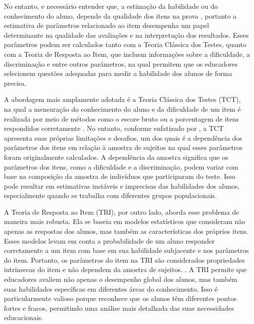 No entanto, e necessário entender que, a estimação da habilidade ou do conhecimento do aluno, depende da qualidade dos itens na prova \cite{BORGATTO2012}, portanto a estimativa de parâmetros relacionado ao item desempenha um papel determinante na qualidade das avaliações e na interpretação dos resultados. Esses parâmetros podem ser calculados tanto com a Teoria Clássica dos Testes, quanto com a Teoria de Resposta ao Item, que incluem informações sobre a dificuldade, a discriminação e entre outros parâmetros, na qual permitem que os educadores selecionem questões adequadas para medir a habilidade dos alunos de forma precisa. 

A abordagem mais amplamente adotada é a Teoria Clássica dos Testes (TCT), na qual a mensuração do conhecimento do aluno e da dificuldade de um item é realizada por meio de métodos como o escore bruto ou a porcentagem de itens respondidos corretamente \cite{pasquali2003}. No entanto, conforme enfatizado por , a TCT apresenta suas próprias limitações e desafios, um dos quais é a dependência dos parâmetros dos itens em relação à amostra de sujeitos na qual esses parâmetros foram originalmente calculados. A dependência da amostra significa que os parâmetros dos itens, como a dificuldade e a discriminação, podem variar com base na composição da amostra de indivíduos que participaram do teste. Isso pode resultar em estimativas instáveis e imprecisas das habilidades dos alunos, especialmente quando se trabalha com diferentes grupos populacionais.

\begin{comment}
	 É importante ressaltar que, de acordo com Pasquali (2003), a TCT não mede diretamente o traço latente e sim avalia o comportamento observado dos alunos em relação aos itens.
\end{comment}


A Teoria de Resposta ao Item (TRI), por outro lado, aborda esse problema de maneira mais robusta. Ela se baseia em modelos estatísticos que consideram não apenas as respostas dos alunos, mas também as características dos próprios itens. Esses modelos levam em conta a probabilidade de um aluno responder corretamente a um item com base em sua habilidade subjacente e nos parâmetros do item. Portanto, os parâmetros do item na TRI são considerados propriedades intrínsecas do item e não dependem da amostra de sujeitos. \cite{pasquali2018}. A TRI permite que educadores avaliem não apenas o desempenho global dos alunos, mas também suas habilidades específicas em diferentes áreas do conhecimento. Isso é particularmente valioso porque reconhece que os alunos têm diferentes pontos fortes e fracos, permitindo uma análise mais detalhada das suas necessidades educacionais. 

